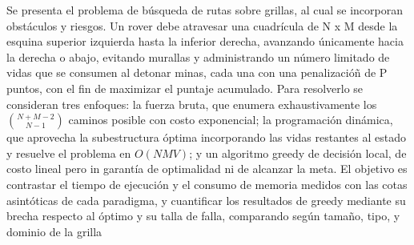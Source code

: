 Se presenta el problema de búsqueda de rutas sobre grillas, al cual se incorporan obstáculos y riesgos. Un rover debe atravesar una cuadrícula de N x M desde la esquina superior izquierda hasta la inferior derecha, avanzando únicamente hacia la derecha o abajo, evitando murallas y administrando un número limitado de vidas que se consumen al detonar minas, cada una con una penalizacióñ de P puntos, con el fin de maximizar el puntaje acumulado. Para resolverlo se consideran tres enfoques: la fuerza bruta, que enumera exhaustivamente los $\binom{N + M - 2}{N - 1}$ caminos posible con costo exponencial; la programación dinámica, que aprovecha la subestructura óptima incorporando las vidas restantes al estado y resuelve el problema en $O(NMV)$; y un algoritmo greedy de decisión local, de costo lineal pero in garantía de optimalidad ni de alcanzar la meta.
El objetivo es contrastar el tiempo de ejecución y el consumo de memoria medidos con las cotas asintóticas de cada paradigma, y cuantificar los resultados de greedy mediante su brecha respecto al óptimo y su talla de falla, comparando según tamaño, tipo, y dominio de la grilla
